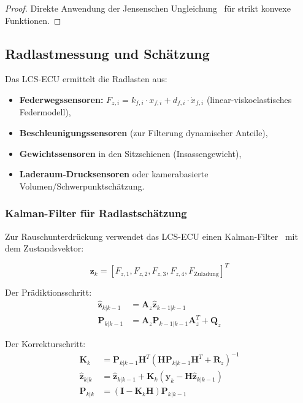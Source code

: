 ﻿\documentclass[12pt,a4paper]{article}
\theoremstyle{definition}
\theoremstyle{remark}
\begin{document}
\begin{proof}
Direkte Anwendung der Jensenschen Ungleichung~\cite{Jensen1906} für strikt
konvexe Funktionen.
\end{proof}

\subsection{Radlastmessung und Schätzung}

Das LCS-ECU ermittelt die Radlasten aus:
\begin{itemize}
  \item \textbf{Federwegssensoren:} $F_{z,i} = k_{f,i} \cdot x_{f,i} + d_{f,i} \cdot \dot{x}_{f,i}$
        (linear-viskoelastisches Federmodell),
  \item \textbf{Beschleunigungssensoren} (zur Filterung dynamischer Anteile),
  \item \textbf{Gewichtssensoren} in den Sitzschienen (Insassengewicht),
  \item \textbf{Laderaum-Drucksensoren} oder kamerabasierte Volumen/Schwerpunktschätzung.
\end{itemize}

\subsubsection{Kalman-Filter für Radlastschätzung}

Zur Rauschunterdrückung verwendet das LCS-ECU einen Kalman-Filter~\cite{Kalman1960}
mit dem Zustandsvektor:

\begin{equation}
  \mathbf{z}_k = \left[F_{z,1}, F_{z,2}, F_{z,3}, F_{z,4}, F_{\mathrm{Zuladung}}\right]^T
\end{equation}

Der Prädiktionsschritt:
\begin{align}
  \hat{\mathbf{z}}_{k|k-1} &= \mathbf{A}_z \hat{\mathbf{z}}_{k-1|k-1}\\
  \mathbf{P}_{k|k-1} &= \mathbf{A}_z \mathbf{P}_{k-1|k-1} \mathbf{A}_z^T + \mathbf{Q}_z
\end{align}

Der Korrekturschritt:
\begin{align}
  \mathbf{K}_k &= \mathbf{P}_{k|k-1}\mathbf{H}^T
    (\mathbf{H}\mathbf{P}_{k|k-1}\mathbf{H}^T + \mathbf{R}_z)^{-1}\\
  \hat{\mathbf{z}}_{k|k} &= \hat{\mathbf{z}}_{k|k-1} + \mathbf{K}_k
    (\mathbf{y}_k - \mathbf{H}\hat{\mathbf{z}}_{k|k-1})\\
  \mathbf{P}_{k|k} &= (\mathbf{I} - \mathbf{K}_k \mathbf{H})\mathbf{P}_{k|k-1}
\end{align}
\end{document}
